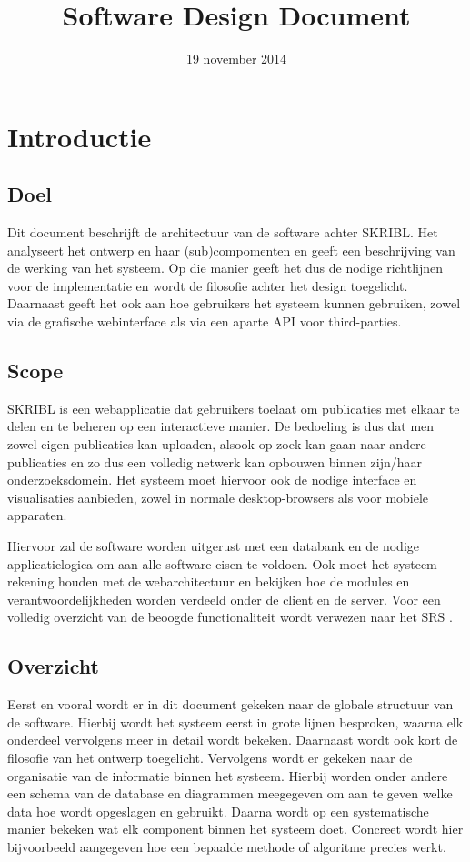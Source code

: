 \documentclass{article}
\title{Software Design Document}
\author{} %
\date{19 november 2014} %
\begin{document}




\tableofcontents
\newpage

\section{Introductie}

\subsection{Doel}

Dit document beschrijft de architectuur van de software achter SKRIBL. 
Het analyseert het ontwerp en haar (sub)compomenten en geeft een beschrijving
van de werking van het systeem. Op die manier geeft het dus de nodige richtlijnen
voor de implementatie en wordt de filosofie achter het design toegelicht.
Daarnaast geeft het ook aan hoe gebruikers het systeem kunnen gebruiken, zowel
via de grafische webinterface als via een aparte API voor third-parties.

\subsection{Scope}

SKRIBL is een webapplicatie dat gebruikers toelaat om publicaties met elkaar te delen
en te beheren op een interactieve manier. De bedoeling is dus dat men zowel eigen publicaties kan uploaden, alsook op zoek kan gaan naar andere publicaties en zo dus een volledig netwerk kan opbouwen binnen zijn/haar onderzoeksdomein. Het systeem moet hiervoor ook de nodige interface en visualisaties aanbieden, zowel in normale desktop-browsers als voor mobiele apparaten.

Hiervoor zal de software worden uitgerust met een databank en de nodige applicatielogica om aan alle software eisen te voldoen. Ook moet het systeem rekening houden met de webarchitectuur en bekijken hoe de modules en verantwoordelijkheden worden verdeeld onder de client en de server. Voor een volledig overzicht van de beoogde functionaliteit wordt verwezen naar het SRS \cite{Xtreport:SRS}.

\subsection{Overzicht}

Eerst en vooral wordt er in dit document gekeken naar de globale structuur van de software. Hierbij wordt het systeem eerst in grote lijnen besproken, waarna elk onderdeel vervolgens meer in detail wordt bekeken. Daarnaast wordt ook kort de filosofie van het ontwerp toegelicht. 
Vervolgens wordt er gekeken naar de organisatie van de informatie binnen het systeem. Hierbij worden onder andere een schema van de database en diagrammen meegegeven om aan te geven welke data hoe wordt opgeslagen en gebruikt. 
Daarna wordt op een systematische manier bekeken wat elk component binnen het systeem doet. Concreet wordt hier bijvoorbeeld aangegeven hoe een bepaalde methode of algoritme precies werkt.
\end{document}

